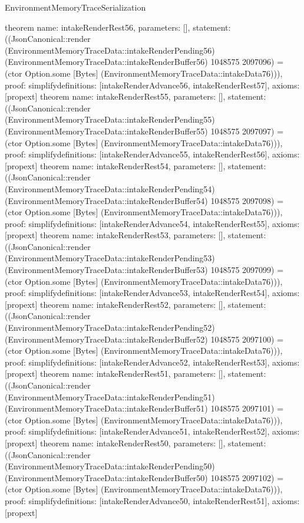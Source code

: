 \begin{lexlean}{EnvironmentMemoryTraceSerialization}
\begin{semanticmodule}
{}
theorem{
 name: intakeRenderRest56, parameters: [],
 statement: ((JsonCanonical::render (EnvironmentMemoryTraceData::intakeRenderPending56) (EnvironmentMemoryTraceData::intakeRenderBuffer56) 1048575 2097096) = (ctor Option.some [Bytes] (EnvironmentMemoryTraceData::intakeData76))), proof: simplify{definitions: [intakeRenderAdvance56, intakeRenderRest57]}, axioms: [propext]
}
theorem{
 name: intakeRenderRest55, parameters: [],
 statement: ((JsonCanonical::render (EnvironmentMemoryTraceData::intakeRenderPending55) (EnvironmentMemoryTraceData::intakeRenderBuffer55) 1048575 2097097) = (ctor Option.some [Bytes] (EnvironmentMemoryTraceData::intakeData76))), proof: simplify{definitions: [intakeRenderAdvance55, intakeRenderRest56]}, axioms: [propext]
}
theorem{
 name: intakeRenderRest54, parameters: [],
 statement: ((JsonCanonical::render (EnvironmentMemoryTraceData::intakeRenderPending54) (EnvironmentMemoryTraceData::intakeRenderBuffer54) 1048575 2097098) = (ctor Option.some [Bytes] (EnvironmentMemoryTraceData::intakeData76))), proof: simplify{definitions: [intakeRenderAdvance54, intakeRenderRest55]}, axioms: [propext]
}
theorem{
 name: intakeRenderRest53, parameters: [],
 statement: ((JsonCanonical::render (EnvironmentMemoryTraceData::intakeRenderPending53) (EnvironmentMemoryTraceData::intakeRenderBuffer53) 1048575 2097099) = (ctor Option.some [Bytes] (EnvironmentMemoryTraceData::intakeData76))), proof: simplify{definitions: [intakeRenderAdvance53, intakeRenderRest54]}, axioms: [propext]
}
theorem{
 name: intakeRenderRest52, parameters: [],
 statement: ((JsonCanonical::render (EnvironmentMemoryTraceData::intakeRenderPending52) (EnvironmentMemoryTraceData::intakeRenderBuffer52) 1048575 2097100) = (ctor Option.some [Bytes] (EnvironmentMemoryTraceData::intakeData76))), proof: simplify{definitions: [intakeRenderAdvance52, intakeRenderRest53]}, axioms: [propext]
}
theorem{
 name: intakeRenderRest51, parameters: [],
 statement: ((JsonCanonical::render (EnvironmentMemoryTraceData::intakeRenderPending51) (EnvironmentMemoryTraceData::intakeRenderBuffer51) 1048575 2097101) = (ctor Option.some [Bytes] (EnvironmentMemoryTraceData::intakeData76))), proof: simplify{definitions: [intakeRenderAdvance51, intakeRenderRest52]}, axioms: [propext]
}
theorem{
 name: intakeRenderRest50, parameters: [],
 statement: ((JsonCanonical::render (EnvironmentMemoryTraceData::intakeRenderPending50) (EnvironmentMemoryTraceData::intakeRenderBuffer50) 1048575 2097102) = (ctor Option.some [Bytes] (EnvironmentMemoryTraceData::intakeData76))), proof: simplify{definitions: [intakeRenderAdvance50, intakeRenderRest51]}, axioms: [propext]
}
\end{semanticmodule}
\end{lexlean}
